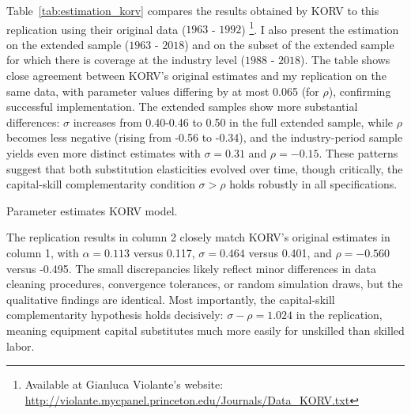 \documentclass[12pt]{article}
\begin{document}
Table~\ref{tab:estimation_korv} compares the results obtained by KORV to this replication using their 
original data ($1963$ - $1992$) \footnote{Available at Gianluca Violante's website: \url{http://violante.mycpanel.princeton.edu/Journals/Data_KORV.txt}}. I also present the estimation on the extended sample ($1963$ - $2018$) and on the subset of the extended sample for which there is coverage at the industry level ($1988$ - $2018$). The table shows close agreement between KORV's original estimates and my replication on the same data, with parameter values differing by at most 0.065 (for $\rho$), confirming successful implementation. The extended samples show more substantial differences: $\sigma$ increases from 0.40-0.46 to 0.50 in the full extended sample, while $\rho$ becomes less negative (rising from -0.56 to -0.34), and the industry-period sample yields even more distinct estimates with $\sigma = 0.31$ and $\rho = -0.15$. These patterns suggest that both substitution elasticities evolved over time, though critically, the capital-skill complementarity condition $\sigma > \rho$ holds robustly in all specifications. 



\begin{table}[H]
\begin{center}
 
 \caption{\label{tab:estimation_korv} Parameter estimates KORV model.}
\end{center}
\end{table}

The replication results in column 2 closely match KORV's original estimates in column 1, with $\alpha = 0.113$ versus 0.117, $\sigma = 0.464$ versus 0.401, and $\rho = -0.560$ versus -0.495. The small discrepancies likely reflect minor differences in data cleaning procedures, convergence tolerances, or random simulation draws, but the qualitative findings are identical. Most importantly, the capital-skill complementarity hypothesis holds decisively: $\sigma - \rho = 1.024$ in the replication, meaning equipment capital substitutes much more easily for unskilled than skilled labor.
\end{document}
